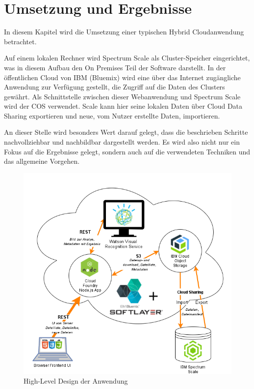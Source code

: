 \chapter{Umsetzung und Ergebnisse}\label{ch:realization}

In diesem Kapitel wird die Umsetzung einer typischen Hybrid Cloudanwendung betrachtet. 

Auf einem lokalen Rechner wird Spectrum Scale als Cluster-Speicher eingerichtet, was in diesem Aufbau den \gls{On Premise}s Teil der Software darstellt.
In der öffentlichen Cloud von IBM (Bluemix) wird eine über das Internet zugängliche Anwendung zur Verfügung gestellt, die Zugriff auf die Daten des Clusters gewährt. Als Schnittstelle zwischen dieser Webanwendung und Spectrum Scale wird der \ac{COS} verwendet. Scale kann hier seine lokalen Daten über Cloud Data Sharing exportieren und neue, vom Nutzer erstellte Daten, importieren.

An dieser Stelle wird besonders Wert darauf gelegt, dass die beschrieben Schritte nachvollziehbar und nachbildbar dargestellt werden. Es wird also nicht nur ein Fokus auf die Ergebnisse gelegt, sondern auch auf die verwendeten Techniken und das allgemeine Vorgehen.

\begin{figure}[hbt]
	\centering
	\includegraphics[scale=0.7]{images/demo-architecture-overview}
	\caption{High-Level Design der Anwendung}
	\label{fig:demoarchitectureoverview}
\end{figure}

